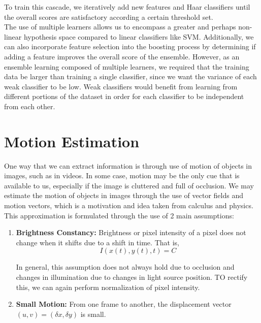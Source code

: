 \documentclass[12pt]{article}
\begin{document}
To train this cascade, we iteratively add new features and Haar classifiers until the overall scores are satisfactory according a certain threshold set.\\

The use of multiple learners allows us to encompass a greater and perhaps non-linear hypothesis space compared to linear classifiers like SVM. Additionally, we can also incorporate feature selection into the boosting process by determining if adding a feature improves the overall score of the ensemble. However, as an ensemble learning composed of multiple learners, we required that the training data be larger than training a single classifier, since we want the variance of each weak classifier to be low. Weak classifiers would benefit from learning from different portions of the dataset in order for each classifier to be independent from each other.

\section{Motion Estimation}

One way that we can extract information is through use of motion of objects in images, such as in videos. In some case, motion may be the only cue that is available to us, especially if the image is cluttered and full of occlusion. We may estimate the motion of objects in images through the use of vector fields and motion vectors, which is a motivation and idea taken from calculus and physics. This approximation is formulated through the use of 2 main assumptions:

\begin{enumerate}
\item \textbf{Brightness Constancy:} Brightness or pixel intensity of a pixel does not change when it shifts due to a shift in time. That is,
\begin{equation*}
I(x(t), y(t), t) = C
\end{equation*}

In general, this assumption does not always hold due to occlusion and changes in illumination due to changes in light source position. TO rectify this, we can again perform normalization of pixel intensity.

\item \textbf{Small Motion:} From one frame to another, the displacement vector $(u, v) = (\delta x, \delta y)$ is small.
\end{enumerate}
\end{document}

